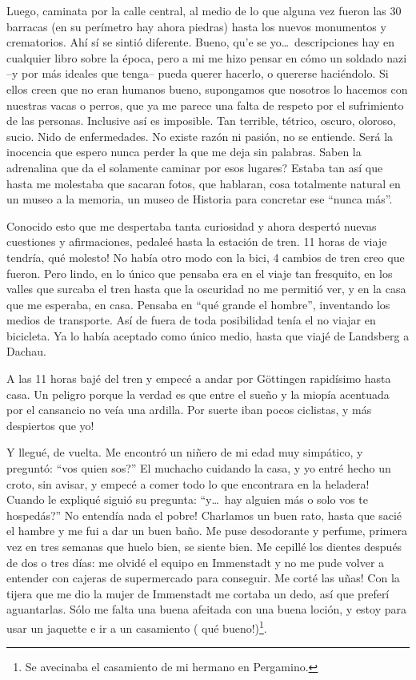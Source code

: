 Luego, caminata por la calle central, al medio de lo que alguna vez fueron las
30 barracas (en su per\'imetro hay ahora piedras) hasta los nuevos monumentos
y crematorios. Ah\'i s\'i se sinti\'o diferente. Bueno, qu'e se yo\ldots\
descripciones hay en cualquier libro sobre la \'epoca, pero a mi me hizo
pensar en c\'omo un soldado nazi --y por m\'as ideales que tenga-- pueda
querer hacerlo, o quererse haci\'endolo. Si ellos creen que no eran humanos
bueno, supongamos que nosotros lo hacemos con nuestras vacas o perros, que ya
me parece una falta de respeto por el sufrimiento de las personas. Inclusive
as\'i es imposible. Tan terrible, t\'etrico, oscuro, oloroso, sucio. Nido de
enfermedades. No existe raz\'on ni pasi\'on, no se entiende. Ser\'a la
inocencia que espero nunca perder la que me deja sin palabras.
\textquestiondown Saben la adrenalina que da el solamente caminar por esos
lugares? Estaba tan as\'i que hasta me molestaba que sacaran fotos, que
hablaran, cosa totalmente natural en un museo a la memoria, un museo de
Historia para concretar ese ``nunca m\'as''.

Conocido esto que me despertaba tanta curiosidad y ahora despert\'o nuevas
cuestiones y afirmaciones, pedale\'e hasta la estaci\'on de tren. 11 horas de
viaje tendr\'ia, \textexclamdown qu\'e molesto! No hab\'ia otro modo con la
bici, 4 cambios de tren creo que fueron. Pero lindo, en lo \'unico que pensaba
era en el viaje tan fresquito, en los valles que surcaba el tren hasta que la
oscuridad no me permiti\'o ver, y en la casa que me esperaba, en casa. Pensaba
en ``qu\'e grande el hombre'', inventando los medios de transporte. As\'i de
fuera de toda posibilidad ten\'ia el no viajar en bicicleta. Ya lo hab\'ia
aceptado como \'unico medio, hasta que viaj\'e de Landsberg a Dachau.

A las 11 horas baj\'e del tren y empec\'e a andar por G\"ottingen rapid\'isimo
hasta casa. Un peligro porque la verdad es que entre el sue\~no y la miop\'ia
acentuada por el cansancio no ve\'ia una ardilla. \textexclamdown Por suerte
iban pocos ciclistas, y m\'as despiertos que yo!

Y llegu\'e, de vuelta. Me encontr\'o un ni\~nero de mi edad muy simp\'atico, y
pregunt\'o: ``\textquestiondown vos quien sos?'' \textexclamdown El muchacho
cuidando la casa, y yo entr\'e hecho un croto, sin avisar, y empec\'e a comer
todo lo que encontrara en la heladera! Cuando le expliqu\'e sigui\'o su
pregunta: ``y\ldots\ \textquestiondown hay alguien m\'as o solo vos te
hosped\'as?'' \textexclamdown No entend\'ia nada el pobre! Charlamos un buen
rato, hasta que saci\'e el hambre y me fui a dar un buen ba\~no. Me puse
desodorante y perfume, primera vez en tres semanas que huelo bien, se siente
bien. Me cepill\'e los dientes despu\'es de dos o tres d\'ias: me olvid\'e el
equipo en Immenstadt y no me pude volver a entender con cajeras de
supermercado para conseguir. \textexclamdown Me cort\'e las u\~nas! Con la
tijera que me dio la mujer de Immenstadt me cortaba un dedo, as\'i que
prefer\'i aguantarlas. S\'olo me falta una buena afeitada con una buena
loci\'on, y estoy para usar un jaquette e ir a un casamiento (\textexclamdown
qu\'e bueno!)\protect\footnote{Se avecinaba el casamiento de mi hermano
en Pergamino.}.

